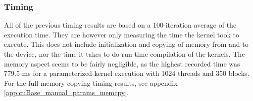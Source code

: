 \begin{table}[h!]
\centering
{}
\caption{Number of unequal results with various error tolerances. 32 = single precision, 64 = double precision \label{table:errorComparison}}
\end{table}

\subsubsection{Timing}
All of the previous timing results are based on a 100-iteration average of the execution time.
They are however only measuring the time the kernel took to execute.
This does not include initialization and copying of memory from and to the device, nor the time it takes to do run-time compilation of the kernels.
The memory aspect seems to be fairly negligible, as the highest recorded time was 779.5 ms for a parameterized kernel execution with 1024 threads and 350 blocks.
For the full memory copying timing results, see appendix \ref{app:cuBase_manual_params_memcpy}.

